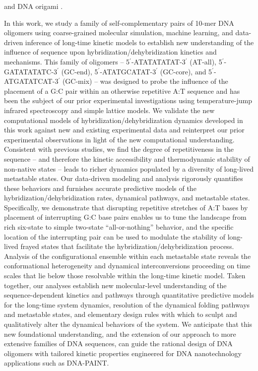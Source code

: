 \documentclass[journal=jpcbfk,manuscript=article]{achemso}
\begin{document}
\citep{Srinivas2013OnDisplacement, Haley2020DesignDisplacement} and DNA origami \citep{Snodin2019Coarse-grainedOrigami, Doye2020TheOrigami}.

In this work, we study a family of self-complementary pairs of 10-mer DNA oligomers using coarse-grained molecular simulation, machine learning, and data-driven inference of long-time kinetic models to establish new understanding of the influence of sequence upon hybridization/dehybridization kinetics and mechanisms. This family of oligomers -- 5$^\prime$-ATATATATAT-3$^\prime$ (AT-all), 5$^\prime$-GATATATATC-3$^\prime$ (GC-end), 5$^\prime$-ATATGCATAT-3$^\prime$ (GC-core), and 5$^\prime$-ATGATATCAT-3$^\prime$ (GC-mix) -- was designed to probe the influence of the placement of a G:C pair within an otherwise repetitive A:T sequence and has been the subject of our prior experimental investigations using temperature-jump infrared spectroscopy and simple lattice models. \citep{Sanstead2016} We validate the new computational models of hybridization/dehybridization dynamics developed in this work against new and existing experimental data and reinterpret our prior experimental observations in light of the new computational understanding. Consistent with previous studies, \citep{Phys2014,Romano2013DNADependence,Araque2016LatticeCooperativity} we find the degree of repetitiveness in the sequence -- and therefore the kinetic accessibility and thermodynamic stability of non-native states -- leads to richer dynamics populated by a diversity of long-lived metastable states. Our data-driven modeling and analysis rigorously quantifies these behaviors and furnishes accurate predictive models of the hybridization/dehybridization rates, dynamical pathways, and metastable states. Specifically, we demonstrate that disrupting repetitive stretches of A:T bases by placement of interrupting G:C base pairs enables us to tune the landscape from rich six-state to simple two-state ``all-or-nothing'' behavior, and the specific location of the interrupting pair can be used to modulate the stability of long-lived frayed states that facilitate the hybridization/dehybridization process. Analysis of the configurational ensemble within each metastable state reveals the conformational heterogeneity and dynamical interconversions proceeding on time scales that lie below those resolvable within the long-time kinetic model. Taken together, our analyses establish new molecular-level understanding of the sequence-dependent kinetics and pathways through quantitative predictive models for the long-time system dynamics, resolution of the dynamical folding pathways and metastable states, and elementary design rules with which to sculpt and qualitatively alter the dynamical behaviors of the system. We anticipate that this new foundational understanding, and the extension of our approach to more extensive families of DNA sequences, can guide the rational design of DNA oligomers with tailored kinetic properties engineered for DNA nanotechnology applications such as DNA-PAINT. \citep{Shah2019, Strauss2020UpDNA-PAINT}
\end{document}

